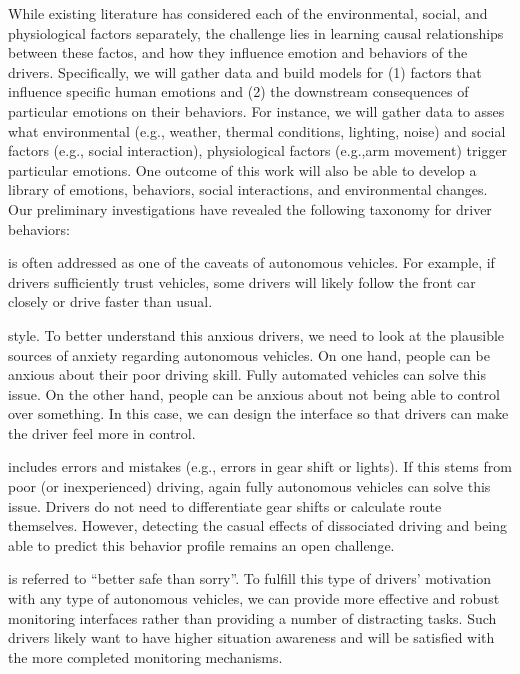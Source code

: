 While existing literature has considered each of the environmental, social, and physiological factors separately, the challenge lies in learning causal relationships between these factos, and how they influence emotion and behaviors of the drivers.  
Specifically, we will gather data and build models for (1) factors that influence specific human emotions and (2) the downstream consequences of particular emotions on their behaviors. 
For instance, we will gather data to asses what environmental (e.g., weather, thermal conditions, lighting, noise) and social factors (e.g., social interaction), physiological factors (e.g.,arm movement) trigger particular emotions. 
One outcome of this work will also be able to develop a library of emotions, behaviors, social interactions, and environmental changes. 
Our preliminary investigations have revealed the following taxonomy for driver behaviors:

 is often addressed as one of the caveats of autonomous vehicles. For example, if drivers sufficiently trust vehicles, some drivers will likely follow the front car closely or drive faster than usual. 

 style. To better understand this anxious drivers, we need to look at the plausible sources of anxiety regarding autonomous vehicles. On one hand, people can be anxious about their poor driving skill. Fully automated vehicles can solve this issue. On the other hand, people can be anxious about not being able to control over something. In this case, we can design the interface so that drivers can make the driver feel more in control.

 includes errors and mistakes (e.g., errors in gear shift or lights). If this stems from poor (or inexperienced) driving, again fully autonomous vehicles can solve this issue. Drivers do not need to differentiate gear shifts or calculate route themselves. However, detecting the casual effects of dissociated driving and being able to predict this behavior profile remains an open challenge.


 is referred to ``better safe than sorry''. 
To fulfill this type of drivers' motivation with any type of autonomous vehicles, we can provide more effective and robust monitoring interfaces rather than providing a number of distracting tasks. Such drivers likely want to have higher situation awareness and will be satisfied with the more completed monitoring mechanisms.

